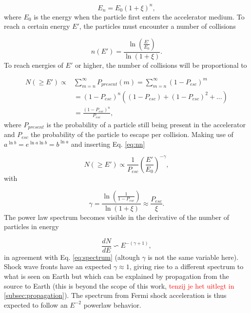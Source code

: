 \begin{equation}
E_n = E_0 \left(1+\xi\right)^n,
\end{equation}
where $E_0$ is the energy when the particle first enters the accelerator medium. To reach a certain energy $E'$, the particles must encounter a number of collisions

\begin{equation}
\label{eq:nn}
n(E') = \frac{\ln \left(\frac{E'}{E_0}\right)}{\ln \left(1+\xi \right)}.
\end{equation}
To reach energies of $E'$ or higher, the number of collisions will be proportional to

\begin{equation}
\begin{split}
N(\geq E') \varpropto &\sum^\infty_{m=n} P_{present}(m) = \sum^\infty_{m=n} \left(1-P_{esc} \right)^m\\
&= (1-P_{esc})^n \left((1 - P_{esc}) + (1 - P_{esc})^2 + ...\right) \\
&= \frac{(1-P_{esc})^n}{P_{esc}},
\end{split}
\end{equation}
where $P_{present}$ is the probability of a particle still being present in the accelerator and $P_{esc}$ the probability of the particle to escape per collision. Making use of $a^{\ln b} = e^{\ln a \ln b} = b^{\ln a}$ and inserting Eq. \ref{eq:nn}

\begin{equation}
N(\geq E') \varpropto \frac{1}{P_{esc}} \left(\frac{E'}{E_0}\right)^{-\gamma},
\end{equation}
with

\begin{equation}
\gamma = \frac{\ln \left(\frac{1}{1-P_{esc}}\right)}{\ln \left(1 + \xi \right)} \approx \frac{P_{esc}}{\xi}.
\end{equation}
The power law spectrum becomes visible in the derivative of the number of particles in energy

\begin{equation}
\frac{dN}{dE} \backsim E^{-(\gamma + 1)},
\end{equation}
in agreement with Eq. \ref{eq:spectrum} (altough $\gamma$ is not the same variable here). Shock wave fronts have an expected $\gamma \approx 1$, giving rise to a different spectrum to what is seen on Earth but which can be explained by propagation from the source to Earth (this is beyond the scope of this work, \textcolor{red}{tenzij je het uitlegt in \ref{subsec:propagation}}). The spectrum from Fermi shock acceleration is thus expected to follow an $E^{-2}$ powerlaw behavior.

